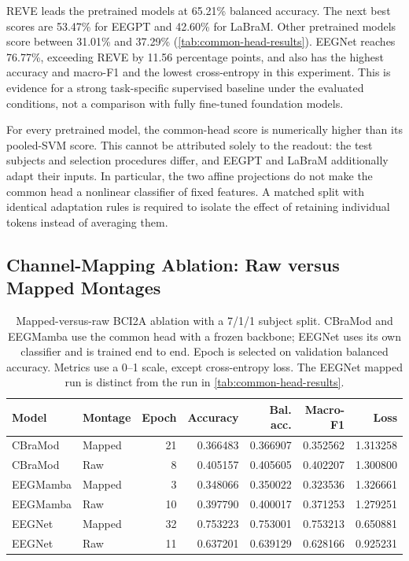 \documentclass{article}
\begin{document}
REVE leads the pretrained models at 65.21\% balanced accuracy.
The next best scores are 53.47\% for EEGPT and 42.60\% for LaBraM.
Other pretrained models score between 31.01\% and 37.29\%
(\cref{tab:common-head-results}). EEGNet reaches 76.77\%, exceeding REVE
by 11.56 percentage points, and also has the highest accuracy and macro-F1
and the lowest cross-entropy in this experiment. This is evidence for a
strong task-specific supervised baseline under the evaluated conditions,
not a comparison with fully fine-tuned foundation models.

For every pretrained model, the common-head score is numerically higher
than its pooled-SVM score. This cannot be attributed solely to the
readout: the test subjects and selection procedures differ, and EEGPT and
LaBraM additionally adapt their inputs. In particular, the two affine
projections do not make the common head a nonlinear classifier of fixed
features. A matched split with identical adaptation rules is required to
isolate the effect of retaining individual tokens instead of averaging them.

\subsection{Channel-Mapping Ablation: Raw versus Mapped Montages}
\label{sec:channel-mapping}

\begin{table}[t]
    \centering
    \caption{Mapped-versus-raw BCI2A ablation with a 7/1/1 subject split.
    CBraMod and EEGMamba use the common head with a frozen backbone; EEGNet
    uses its own classifier and is trained end to end. Epoch is selected
    on validation balanced accuracy. Metrics use a 0--1 scale, except
    cross-entropy loss. The EEGNet mapped run is distinct from the run in
    \cref{tab:common-head-results}.}
    \label{tab:montage-results}
    \small
    \begin{tabular}{llrrrrr}
        \toprule
        Model & Montage & Epoch & Accuracy & Bal. acc. & Macro-F1 & Loss \\
        \midrule
CBraMod & Mapped & 21 & 0.366483 & 0.366907 & 0.352562 & 1.313258 \\
CBraMod & Raw & 8 & 0.405157 & 0.405605 & 0.402207 & 1.300800 \\
        \midrule
EEGMamba & Mapped & 3 & 0.348066 & 0.350022 & 0.323536 & 1.326661 \\
EEGMamba & Raw & 10 & 0.397790 & 0.400017 & 0.371253 & 1.279251 \\
        \midrule
EEGNet & Mapped & 32 & 0.753223 & 0.753001 & 0.753213 & 0.650881 \\
EEGNet & Raw & 11 & 0.637201 & 0.639129 & 0.628166 & 0.925231 \\
        \bottomrule
    \end{tabular}
\end{table}
\end{document}
